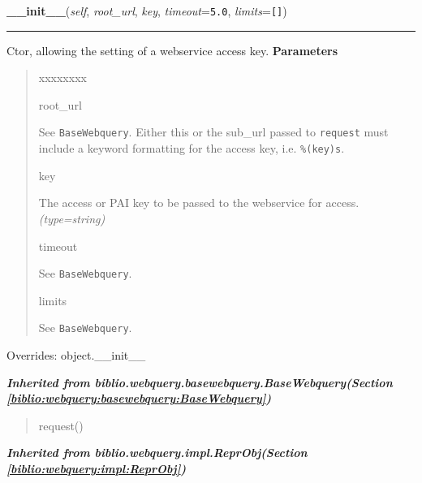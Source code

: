 \hspace{.8\funcindent}\begin{boxedminipage}{\funcwidth}

    \raggedright \textbf{\_\_init\_\_}(\textit{self}, \textit{root\_url}, \textit{key}, \textit{timeout}={\tt 5.0}, \textit{limits}={\tt \texttt{[}\texttt{]}})

    \vspace{-1.5ex}

    \rule{\textwidth}{0.5\fboxrule}
\setlength{\parskip}{2ex}

Ctor, allowing the setting of a webservice access key.
\setlength{\parskip}{1ex}
      \textbf{Parameters}
      \vspace{-1ex}

      \begin{quote}
        \begin{Ventry}{xxxxxxxx}

          \item[root\_url]


See \texttt{BaseWebquery}. Either this or the sub{\_}url passed to \texttt{request}
must include a keyword formatting for the access key, i.e.
\texttt{{\%}(key)s}.
          \item[key]


The access or PAI key to be passed to the webservice for access.
            {\it (type=string)}

          \item[timeout]


See \texttt{BaseWebquery}.
          \item[limits]


See \texttt{BaseWebquery}.
        \end{Ventry}

      \end{quote}

      Overrides: object.\_\_init\_\_

    \end{boxedminipage}


\large{\textbf{\textit{Inherited from biblio.webquery.basewebquery.BaseWebquery\textit{(Section \ref{biblio:webquery:basewebquery:BaseWebquery})}}}}

\begin{quote}
request()
\end{quote}

\large{\textbf{\textit{Inherited from biblio.webquery.impl.ReprObj\textit{(Section \ref{biblio:webquery:impl:ReprObj})}}}}

